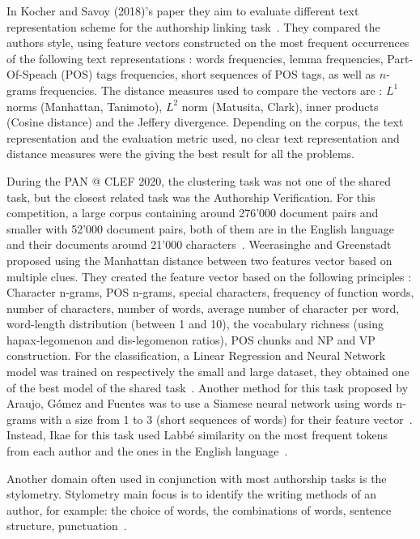In Kocher and Savoy (2018)'s paper they aim to evaluate different text representation scheme for the authorship linking task~\cite{kocher_linking}.
They compared the authors style, using feature vectors constructed on the most frequent occurrences of the following text representations : words frequencies, lemma frequencies, Part-Of-Speach (POS) tags frequencies, short sequences of POS tags, as well as $n$-grams frequencies.
The distance measures used to compare the vectors are : $L^1$ norms (Manhattan, Tanimoto), $L^2$ norm (Matusita, Clark), inner products (Cosine distance) and the Jeffery divergence.
Depending on the corpus, the text representation and the evaluation metric used, no clear text representation and distance measures were the giving the best result for all the problems.

During the PAN @ CLEF 2020, the clustering task was not one of the shared task, but the closest related task was the Authorship Verification.
For this competition, a large corpus containing around 276'000 document pairs and smaller with 52'000 document pairs, both of them are in the English language and their documents around 21'000 characters~\cite{overview_pan20}.
Weerasinghe and Greenstadt proposed using the Manhattan distance between two features vector based on multiple clues.
They created the feature vector based on the following principles : Character n-grams, POS n-grams, special characters, frequency of function words, number of characters, number of words, average number of character per word, word-length distribution (between 1 and 10), the vocabulary richness (using hapax-legomenon and dis-legomenon ratios), POS chunks and NP and VP construction.
For the classification, a Linear Regression and Neural Network model was trained on respectively the small and large dataset, they obtained one of the best  model of the shared task~\cite{feature_vector_pan20}.
Another method for this task proposed by Araujo, Gómez and Fuentes was to use a Siamese neural network using words n-grams with a size from 1 to 3 (short sequences of words) for their feature vector~\cite{siamese_network_pan20}.
Instead, Ikae for this task used Labbé similarity on the most frequent tokens from each author and the ones in the English language~\cite{unine_pan20}.

Another domain often used in conjunction with most authorship tasks is the stylometry.
Stylometry main focus is to identify the writing methods of an author, for example: the choice of words, the combinations of words, sentence structure, punctuation~\cite{savoy_stylo}.
